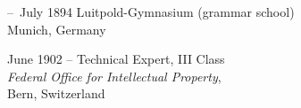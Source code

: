 \begin{cv}{}
\begin{cvlist}{}
            \item[--~July 1894]%
            Luitpold-Gymnasium (grammar school)\\
            Munich, Germany
  
        \end{cvlist}

        \begin{cvlist}{}\label{Employment}
            \item[June 1902 --]%
            Technical Expert, III Class\\
            \emph{Federal Office for Intellectual Property},\\ Bern, Switzerland
        \end{cvlist}
    \end{cv}
\cleardoublepage